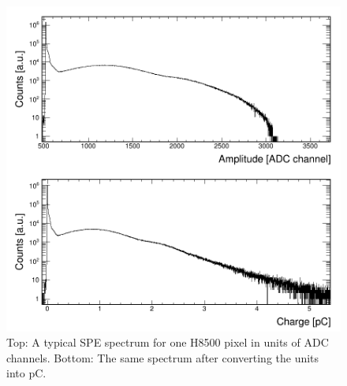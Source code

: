 \begin{figure}[hbt!]
	\centering
	\includegraphics[width=\linewidth]{figures/CA7811_w1_g064_v1100_063_adc_charge.png}
	\caption{Top: A typical SPE spectrum for one H8500 pixel in units of ADC channels. Bottom: The same spectrum after converting the units into pC.}
	\label{fig:H8500calib}
\end{figure}